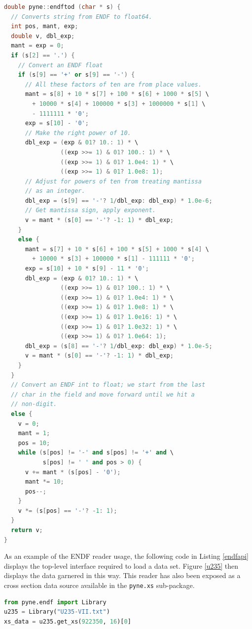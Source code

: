 \documentclass{anstrans}
\begin{document}
\begin{lstlisting}[language=C++,basicstyle=\scriptsize\ttfamily,frame=single,caption=ENDF to Float Implementation,label=endftodlisting]
double pyne::endftod (char * s) {
  // Converts string from ENDF to float64.
  int pos, mant, exp;
  double v, dbl_exp;
  mant = exp = 0;
  if (s[2] == '.') {
    // Convert an ENDF float
    if (s[9] == '+' or s[9] == '-') {
      // All these factors of ten are from place values.
      mant = s[8] + 10 * s[7] + 100 * s[6] + 1000 * s[5] \
        + 10000 * s[4] + 100000 * s[3] + 1000000 * s[1] \
        - 1111111 * '0';
      exp = s[10] - '0';
      // Make the right power of 10.
      dbl_exp = (exp & 01? 10.: 1) * \
                ((exp >>= 1) & 01? 100.: 1) * \
                ((exp >>= 1) & 01? 1.0e4: 1) * \
                ((exp >>= 1) & 01? 1.0e8: 1);
      // Adjust for powers of ten from treating mantissa 
      // as an integer.
      dbl_exp = (s[9] == '-'? 1/dbl_exp: dbl_exp) * 1.0e-6;
      // Get mantissa sign, apply exponent.
      v = mant * (s[0] == '-'? -1: 1) * dbl_exp;
    }
    else {
      mant = s[7] + 10 * s[6] + 100 * s[5] + 1000 * s[4] \
        + 10000 * s[3] + 100000 * s[1] - 111111 * '0';
      exp = s[10] + 10 * s[9] - 11 * '0';
      dbl_exp = (exp & 01? 10.: 1) * \
                ((exp >>= 1) & 01? 100.: 1) * \
                ((exp >>= 1) & 01? 1.0e4: 1) * \
                ((exp >>= 1) & 01? 1.0e8: 1) * \
                ((exp >>= 1) & 01? 1.0e16: 1) * \
                ((exp >>= 1) & 01? 1.0e32: 1) * \
                ((exp >>= 1) & 01? 1.0e64: 1);
      dbl_exp = (s[8] == '-'? 1/dbl_exp: dbl_exp) * 1.0e-5;
      v = mant * (s[0] == '-'? -1: 1) * dbl_exp;
    }
  }
  // Convert an ENDF int to float; we start from the last 
  // char in the field and move forward until we hit a 
  // non-digit.
  else {
    v = 0;
    mant = 1; 
    pos = 10;
    while (s[pos] != '-' and s[pos] != '+' and \
           s[pos] != ' ' and pos > 0) {
      v += mant * (s[pos] - '0');
      mant *= 10;
      pos--;
    }
    v *= (s[pos] == '-'? -1: 1);
  }
  return v;
}
\end{lstlisting}

As an example of the ENDF reader usage, the following code in Listing \ref{endfapi} 
displays the top-level interface required to load a data set.  Figure \ref{u235} 
then displays the data garnered in this way.  This reader has also
been exposed as a cross section data source available in the \texttt{pyne.xs} 
sub-package.

\begin{lstlisting}[language=Python,basicstyle=\scriptsize\ttfamily,frame=single,caption=ENDF Reader API,label=endfapi]
from pyne.endf import Library
u235 = Library("U235-VII.txt")
xs_data = u235.get_xs(922350, 16)[0]
\end{lstlisting}
\end{document}
